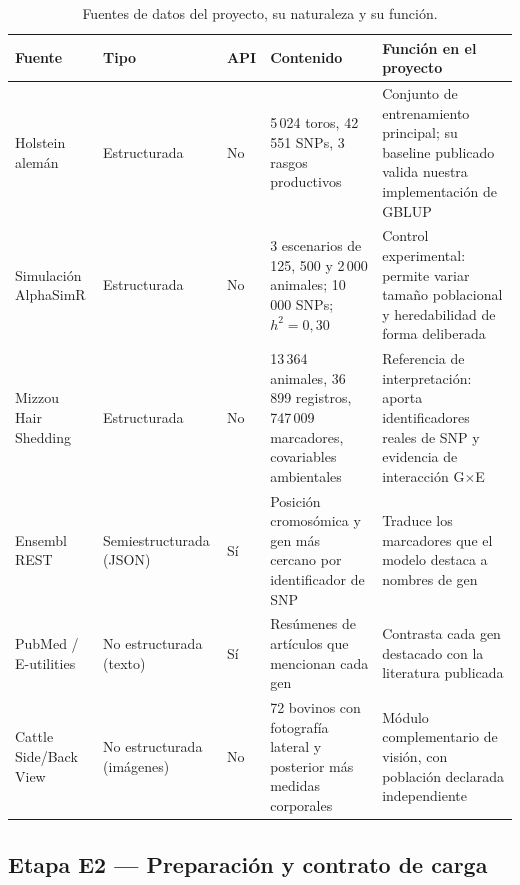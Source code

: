 \documentclass[conference]{IEEEtran}
\begin{document}
\begin{table}[!t]
\centering
\caption{Fuentes de datos del proyecto, su naturaleza y su función.}
\label{tab:fuentes}
\renewcommand{\arraystretch}{1.25}
\footnotesize
\begin{tabular}{p{2.5cm} p{2.0cm} p{1.5cm} p{4.3cm} p{4.5cm}}
\toprule
\textbf{Fuente} & \textbf{Tipo} & \textbf{API} & \textbf{Contenido} &
\textbf{Función en el proyecto} \\
\midrule
Holstein alemán \cite{zhang2015} & Estructurada & No &
5\,024 toros, 42\,551 SNPs, 3 rasgos productivos &
Conjunto de entrenamiento principal; su baseline publicado valida nuestra
implementación de GBLUP \\

Simulación AlphaSimR & Estructurada & No &
3 escenarios de 125, 500 y 2\,000 animales; 10\,000 SNPs; $h^2 = 0{,}30$ &
Control experimental: permite variar tamaño poblacional y heredabilidad de
forma deliberada \\

Mizzou Hair Shedding \cite{durbin2024} & Estructurada & No &
13\,364 animales, 36\,899 registros, 747\,009 marcadores, covariables
ambientales &
Referencia de interpretación: aporta identificadores reales de SNP y
evidencia de interacción G$\times$E \\

Ensembl REST & Semiestructurada (JSON) & Sí &
Posición cromosómica y gen más cercano por identificador de SNP &
Traduce los marcadores que el modelo destaca a nombres de gen \\

PubMed / E-utilities & No estructurada (texto) & Sí &
Resúmenes de artículos que mencionan cada gen &
Contrasta cada gen destacado con la literatura publicada \\

Cattle Side/Back View & No estructurada (imágenes) & No &
72 bovinos con fotografía lateral y posterior más medidas corporales &
Módulo complementario de visión, con población declarada independiente \\
\bottomrule
\end{tabular}
\end{table}

\subsection{Etapa E2 — Preparación y contrato de carga}
\end{document}

